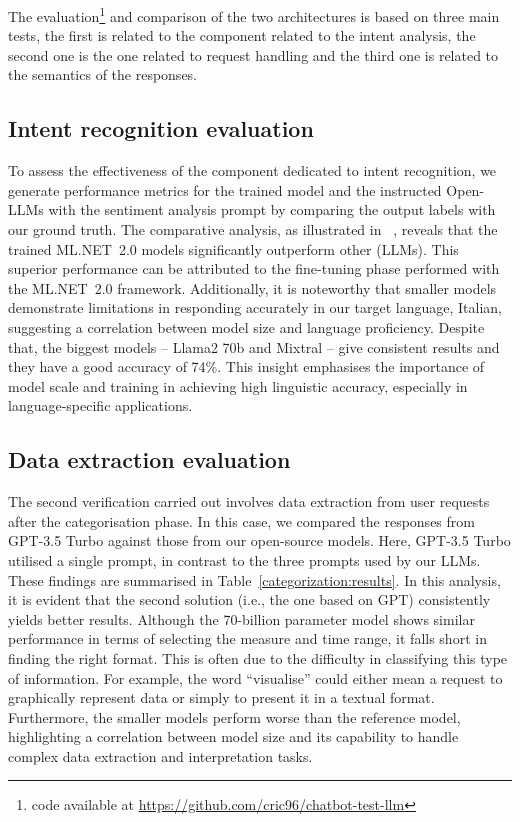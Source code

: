 \documentclass[preprint,12pt]{elsarticle}
\newcommand{\gamm}[1]{{\color{green}{\textbf{[Gianlu-Matte]}~#1}}}
\begin{document}






The evaluation\footnote{code available at \url{https://github.com/cric96/chatbot-test-llm}} and comparison of the two architectures is based on 
three main tests, the first is related to the component related to the intent analysis, the second one is the one related to request handling and the third one is related to the semantics of the responses. 
%
\subsection{Intent recognition evaluation}
%
To assess the effectiveness of the component dedicated to intent recognition, 
we generate performance metrics for the trained model and the instructed Open-LLMs with the sentiment analysis prompt by comparing the output labels with our ground truth. 
%
The comparative analysis, as illustrated in ~, reveals that the trained ML.NET~2.0 models significantly outperform other (LLMs). 
%
This superior performance can be attributed to the fine-tuning phase performed with the ML.NET~2.0 framework. 
Additionally, it is noteworthy that smaller models demonstrate limitations in responding accurately in our target language, Italian, suggesting a correlation between model size and language proficiency.
%
Despite that, the biggest models -- Llama2 70b and Mixtral -- give consistent results and they have a good accuracy of 74\%.
This insight emphasises the importance of model scale and training in achieving high linguistic accuracy, 
especially in language-specific applications.

\subsection{Data extraction evaluation}

The second verification carried out involves data extraction from user requests after the categorisation phase. 
%
In this case, we compared the responses from GPT-3.5 Turbo against those from our open-source models.
%
Here, GPT-3.5 Turbo utilised a single prompt, in contrast to the three prompts used by our LLMs. These findings are summarised in Table~\ref{categorization:results}.
%
In this analysis, it is evident that the second solution (i.e., the one based on GPT) consistently yields better results. 
%
Although the 70-billion parameter model shows similar performance in terms of selecting the measure and time range, it falls short in finding the right format. 
%
This is often due to the difficulty in classifying this type of information.
%
For example, the word ``visualise'' could either mean a request to graphically represent data or simply to present it in a textual format.
%
Furthermore, the smaller models perform worse than the reference model, highlighting a correlation between model size and its capability to handle complex data extraction and interpretation tasks.
\end{document}
